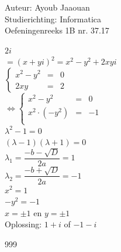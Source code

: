 \documentclass[a4paper]{article}
\begin{document}
  
\noindent \large Auteur: Ayoub Jaaouan          \\
\noindent \large Studierichting: Informatica   \\ 
\noindent \large Oefeningenreeks 1B nr. 37.17   \\

\medskip

\normalsize

$ 2i $\\

$ = (x + yi)^2 = x^2 - y^2 + 2xyi $\\

$\left\{
    \begin{array}{lll} 
        x^2 - y^2 &=& 0 \\
        2xy &=& 2
    \end{array}
\right .$\\

$\Leftrightarrow \left\{
    \begin{array}{lll} 
        x^2 - y^2 &=& 0 \\
        x^2 \cdot (-y^2) &=& -1 \\
    \end{array}
\right .$\\

$ \lambda^2 - 1 = 0 $ \\

$ (\lambda - 1)  (\lambda + 1)= 0 $ \\

$ \lambda_1 = \dfrac{-b - \sqrt{D}}{2a} = 1 $\\

$ \lambda_2 = \dfrac{-b + \sqrt{D}}{2a} = -1  $\\

$ x^2 = 1 $ \\

$ -y^2 = -1 $ \\

$ x = \pm 1 $ en $ y = \pm 1 $\\

Oplossing: $ 1 + i $ of $ -1 - i $

\begin{thebibliography}{999}

\end{thebibliography}
\end{document}
